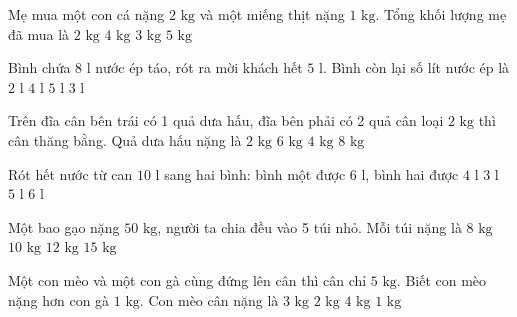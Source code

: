 \begin{ex} %
Mẹ mua một con cá nặng $2\text{ kg}$ và một miếng thịt nặng $1\text{ kg}$. Tổng khối lượng mẹ đã mua là
\choice
{$2\text{ kg}$}
{$4\text{ kg}$}
{\True $3\text{ kg}$}
{$5\text{ kg}$}
\end{ex}

\begin{ex} %
Bình chứa $8\text{ l}$ nước ép táo, rót ra mời khách hết $5\text{ l}$. Bình còn lại số lít nước ép là
\choice
{$2\text{ l}$}
{$4\text{ l}$}
{$5\text{ l}$}
{\True $3\text{ l}$}
\end{ex}

\begin{ex} %
Trên đĩa cân bên trái có 1 quả dưa hấu, đĩa bên phải có 2 quả cân loại $2\text{ kg}$ thì cân thăng bằng. Quả dưa hấu nặng là
\choice
{$2\text{ kg}$}
{$6\text{ kg}$}
{\True $4\text{ kg}$}
{$8\text{ kg}$}
\end{ex}

\begin{ex} %
Rót hết nước từ can $10\text{ l}$ sang hai bình: bình một được $6\text{ l}$, bình hai được
\choice
{\True $4\text{ l}$}
{$3\text{ l}$}
{$5\text{ l}$}
{$6\text{ l}$}
\end{ex}

\begin{ex} %
Một bao gạo nặng $50\text{ kg}$, người ta chia đều vào 5 túi nhỏ. Mỗi túi nặng là
\choice
{$8\text{ kg}$}
{\True $10\text{ kg}$}
{$12\text{ kg}$}
{$15\text{ kg}$}
\end{ex}

\begin{ex} %
Một con mèo và một con gà cùng đứng lên cân thì cân chỉ $5\text{ kg}$. Biết con mèo nặng hơn con gà $1\text{ kg}$. Con mèo cân nặng là
\choice
{\True $3\text{ kg}$}
{$2\text{ kg}$}
{$4\text{ kg}$}
{$1\text{ kg}$}
\end{ex}

